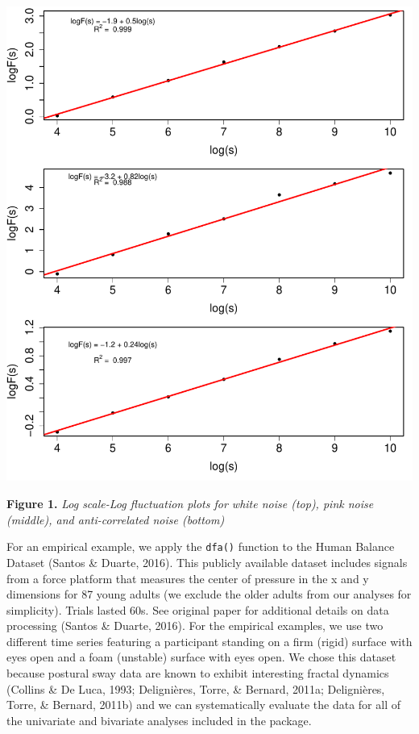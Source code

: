 \documentclass[
  man]{apa6}
\begin{document}
\includegraphics{fractal_regression_paper_brm_files/figure-latex/unnamed-chunk-3-1.pdf}

\textbf{Figure 1.} \emph{Log scale-Log fluctuation plots for white noise (top),
pink noise (middle), and anti-correlated noise (bottom)}

For an empirical example, we apply the \texttt{dfa()} function to the Human
Balance Dataset (Santos \& Duarte, 2016). This publicly available dataset includes
signals from a force platform that measures the center of pressure in
the x and y dimensions for 87 young adults (we exclude the older adults
from our analyses for simplicity). Trials lasted 60s. See original paper
for additional details on data processing (Santos \& Duarte, 2016). For the
empirical examples, we use two different time series featuring a
participant standing on a firm (rigid) surface with eyes open and a foam
(unstable) surface with eyes open. We chose this dataset because
postural sway data are known to exhibit interesting fractal dynamics
(Collins \& De Luca, 1993; Delignières, Torre, \& Bernard, 2011a; Delignières, Torre, \& Bernard, 2011b) and we can
systematically evaluate the data for all of the univariate and bivariate
analyses included in the package.
\end{document}
